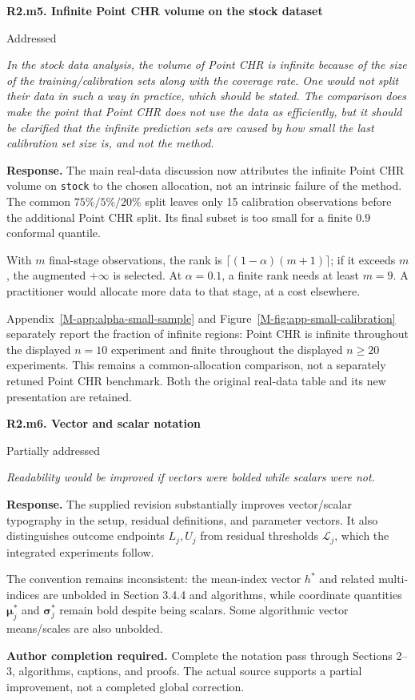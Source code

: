 \documentclass[11pt]{article}
\newcommand{\msapp}[1]{Appendix~\ref*{M-#1}}
\newcommand{\msfig}[1]{Figure~\ref*{M-#1}}
\newcommand{\action}[1]{\par{\small\color{ActionRed}\textbf{Author completion required.} #1\par}}
\newcommand{\point}[3]{\par\Needspace{7\baselineskip}\medskip
\noindent\parbox[t]{0.77\linewidth}{\textbf{#1}}\hfill
\parbox[t]{0.21\linewidth}{\raggedleft\small\sffamily #2}\par\nopagebreak
{\color{ReviewerBlue}\small\itshape #3\par}\textbf{Response.} }
\begin{document}
\point{R2.m5. Infinite Point CHR volume on the stock dataset}{Addressed}{In the stock data analysis, the volume of Point CHR is infinite
because of the size of the training/calibration sets along with
the coverage rate. One would not split their data in such a way
in practice, which should be stated. The comparison does make
the point that Point CHR does not use the data as efficiently,
but it should be clarified that the infinite prediction sets
are caused by how small the last calibration set size is, and
not the method.}
\label{response:R2.m5}
The main real-data discussion now attributes the infinite Point CHR volume on \texttt{stock} to the chosen allocation, not an intrinsic failure of the method. The common $75\%/5\%/20\%$ split leaves only 15 calibration observations before the additional Point CHR split. Its final subset is too small for a finite $0.9$ conformal quantile.

With $m$ final-stage observations, the rank is $\lceil(1-\alpha)(m+1)\rceil$; if it exceeds $m$, the augmented $+\infty$ is selected. At $\alpha=0.1$, a finite rank needs at least $m=9$. A practitioner would allocate more data to that stage, at a cost elsewhere.

\msapp{app:alpha-small-sample} and \msfig{fig:app-small-calibration} separately report the fraction of infinite regions: Point CHR is infinite throughout the displayed $n=10$ experiment and finite throughout the displayed $n\geq20$ experiments. This remains a common-allocation comparison, not a separately retuned Point CHR benchmark. Both the original real-data table and its new presentation are retained.

\point{R2.m6. Vector and scalar notation}{Partially addressed}{Readability would be improved if vectors were bolded while
scalars were not.}
\label{response:R2.m6}
The supplied revision substantially improves vector/scalar typography in the setup, residual definitions, and parameter vectors. It also distinguishes outcome endpoints $L_j,U_j$ from residual thresholds $\mathcal L_j$, which the integrated experiments follow.

The convention remains inconsistent: the mean-index vector $h^*$ and related multi-indices are unbolded in Section 3.4.4 and algorithms, while coordinate quantities $\boldsymbol\mu_j^*$ and $\boldsymbol\sigma_j^*$ remain bold despite being scalars. Some algorithmic vector means/scales are also unbolded.

\action{Complete the notation pass through Sections 2--3, algorithms, captions, and proofs. The actual source supports a partial improvement, not a completed global correction.}
\end{document}
